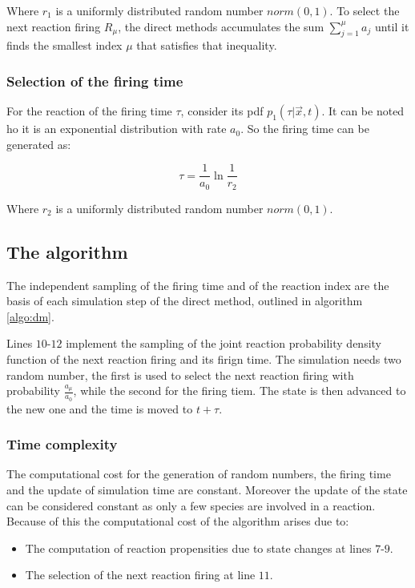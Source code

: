     Where $r_1$ is a uniformly distributed random number $norm(0,1)$.
    To select the next reaction firing $R_\mu$, the direct methods accumulates the sum $\sum\limits_{j=1}^\mu a_j$ until it finds the smallest index $\mu$ that satisfies that inequality.

    \subsubsection{Selection of the firing time}
    For the reaction of the firing time $\tau$, consider its pdf $p_1(\tau|\vec{x},t)$.
    It can be noted ho it is an exponential distribution with rate $a_0$.
    So the firing time can be generated as:

    $$\tau = \frac{1}{a_0}\ln\frac{1}{r_2}$$

    Where $r_2$ is a uniformly distributed random number $norm(0,1)$.

  \subsection{The algorithm}
  The independent sampling of the firing time and of the reaction index are the basis of each simulation step of the direct method, outlined in algorithm \ref{algo:dm}.

  

  Lines $10$-$12$ implement the sampling of the joint reaction probability density function of the next reaction firing and its firign time.
  The simulation needs two random number, the first is used to select the next reaction firing with probability $\frac{a_\mu}{a_0}$, while the second for the firing tiem.
  The state is then advanced to the new one and the time is moved to $t+\tau$.

    \subsubsection{Time complexity}
    The computational cost for the generation of random numbers, the firing time and the update of simulation time are constant.
    Moreover the update of the state can be considered constant as only a few species are involved in a reaction.
    Because of this the computational cost of the algorithm arises due to:

    \begin{multicols}{2}
      \begin{itemize}
        \item The computation of reaction propensities due to state changes at lines $7$-$9$.
        \item The selection of the next reaction firing at line $11$.
      \end{itemize}
    \end{multicols}

